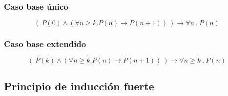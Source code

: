 \documentclass[../main.tex]{subfiles}
\begin{document}
\subsubsection{Caso base único}
\[ (\ P(0) \wedge ( \forall n \geq k . P(n) \rightarrow P(n + 1) )\ ) \rightarrow \forall n\ .\ P(n) \]

\subsubsection{Caso base extendido}
\[ (\ P(k) \wedge ( \forall n \geq k . P(n) \rightarrow P(n + 1) )\ ) \rightarrow \forall n \geq k\ .\ P(n) \]

\subsection{Principio de inducción fuerte}
\end{document}
